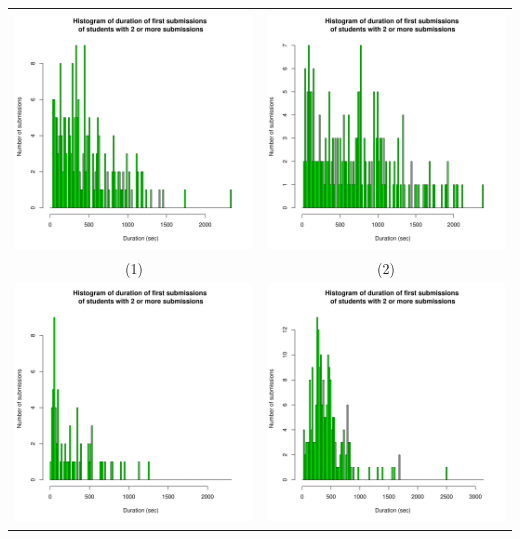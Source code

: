 \documentclass[a4paper]{article}
\theoremstyle{definition}
\begin{document}
\begin{enumerate}[a)]
\begin{itemize}
\begin{center}
\begin{tabular}{c c}
                 \includegraphics[width = 6.9cm]{Images/img12-4-1.png} & \includegraphics[width = 6.9cm]{Images/img12-4-2.png} \\
                 (1) & (2) \\
                 \includegraphics[width = 6.9cm]{Images/img12-4-3.png} &
                 \includegraphics[width = 6.9cm]{Images/img12-4-4.png} \\

\end{tabular}
\end{center}
\end{itemize}
\end{enumerate}
\end{document}
